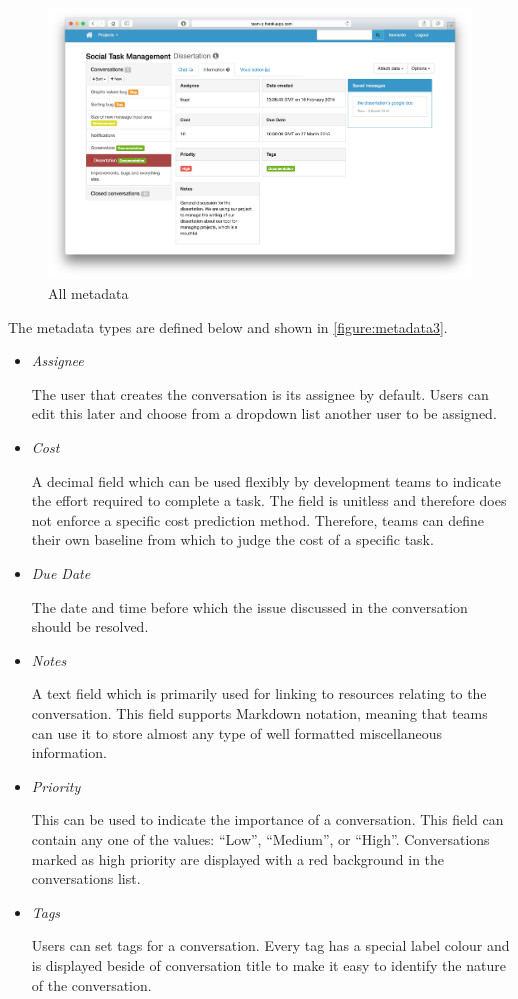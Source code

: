 \documentclass[a4paper]{l3proj}
\begin{document}
\begin{figure}
\centering
\includegraphics[scale=0.3]{allmetadata}
\caption{All metadata}
\label{figure:metadata3}
\end{figure}


The metadata types are defined below and shown in \autoref{figure:metadata3}.

\begin{itemize}
\item \textit{Assignee} \par
The user that creates the conversation is its assignee by default. Users can edit this later and choose from a dropdown list another user to be assigned.
\item \textit{Cost} \par
 A decimal field which can be used flexibly by development teams to indicate the effort required to complete a task. The field is unitless and therefore does not enforce a specific cost prediction method. Therefore, teams can define their own baseline from which to judge the cost of a specific task.
 \item \textit{Due Date} \par
The date and time before which the issue discussed in the conversation should be resolved.
\item \textit{Notes} \par
A text field which is primarily used for linking to resources relating to the conversation. This field supports Markdown notation, meaning that teams can use it to store almost any type of well formatted miscellaneous information.
\item \textit{Priority} \par
This can be used to indicate the importance of a conversation. This field can contain any one of the values: “Low”, “Medium”, or “High”. Conversations marked as high priority are displayed with a red background in the conversations list.
\item \textit{Tags} \par
Users can set tags for a conversation. Every tag has a special label colour and is displayed beside of conversation title to make it easy to identify the nature of the conversation.
\end{itemize}
 
\end{document}
